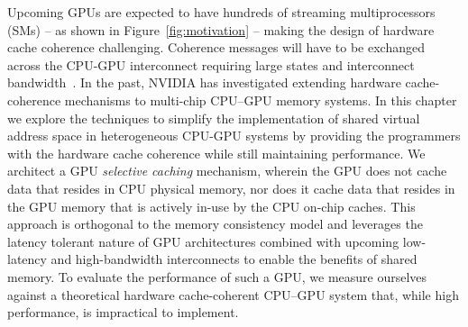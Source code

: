 %
Upcoming GPUs are expected to have hundreds of streaming multiprocessors (SMs)
-- as shown in Figure~\ref{fig:motivation} -- making the design of hardware
cache coherence challenging.  Coherence messages will have to be exchanged
across the CPU-GPU interconnect requiring large states and interconnect
bandwidth~\cite{Kelm2010,johnson2011}.  In the past, NVIDIA has investigated
extending hardware cache-coherence mechanisms to multi-chip CPU--GPU memory
systems. In this chapter we explore the techniques to simplify the
implementation of shared virtual address space in heterogeneous CPU-GPU systems
by providing the programmers with the hardware cache coherence while still
maintaining performance. We architect a GPU \textit{selective caching}
mechanism, wherein
the GPU does not cache data that resides in CPU physical memory, nor does it
cache data that resides in the GPU memory that is actively in-use by the CPU
on-chip caches. This approach is orthogonal to the memory consistency model and
leverages the latency tolerant nature of GPU architectures combined with
upcoming low-latency and high-bandwidth interconnects to enable the benefits of
shared memory.  To evaluate the performance of such a GPU, we measure ourselves
against a theoretical hardware cache-coherent CPU--GPU system that, while high
performance, is impractical to implement.

